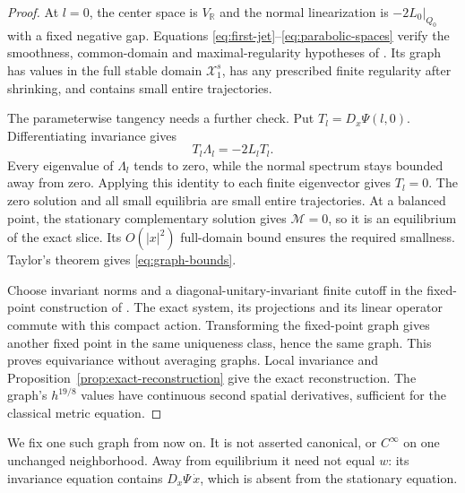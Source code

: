 \documentclass[11pt]{amsart}
\theoremstyle{definition}
\theoremstyle{remark}
\newcommand{\RR}{\mathbb R}
\begin{document}
\begin{proof}
At $l=0$, the center space is $V_{\RR}$ and the normal
linearization is $-2L_0|_{Q_0}$ with a fixed negative gap.
Equations \eqref{eq:first-jet}--\eqref{eq:parabolic-spaces} verify
the smoothness, common-domain and maximal-regularity hypotheses
of \cite[Theorem 2.1]{Simonett94}. Its graph has values in the full
stable domain $\mathcal X_1^s$, has any prescribed finite regularity
after shrinking, and contains small entire trajectories.

The parameterwise tangency needs a further check. Put
$T_l=D_x\Psi(l,0)$. Differentiating invariance gives
\[
 T_l\Lambda_l=-2L_lT_l.
\]
Every eigenvalue of $\Lambda_l$ tends to zero, while the normal
spectrum stays bounded away from zero. Applying this identity to
each finite eigenvector gives $T_l=0$. The zero solution and all
small equilibria are small entire trajectories. At a balanced
point, the stationary complementary solution gives
$\mathcal M=0$, so it is an equilibrium of the exact slice.
Its $O(|x|^2)$ full-domain bound ensures the required smallness.
Taylor's theorem gives \eqref{eq:graph-bounds}.

Choose invariant norms and a diagonal-unitary-invariant finite
cutoff in the fixed-point construction of \cite[Section 2]{Simonett94}.
The exact system, its projections and its linear operator commute
with this compact action. Transforming the fixed-point graph gives
another fixed point in the same uniqueness class, hence the same
graph. This proves equivariance without averaging graphs.
Local invariance and Proposition~\ref{prop:exact-reconstruction}
give the exact reconstruction. The graph's $h^{19/8}$ values
have continuous second spatial derivatives, sufficient for the
classical metric equation.
\end{proof}

We fix one such graph from now on. It is not asserted canonical,
or $C^\infty$ on one unchanged neighborhood. Away from equilibrium
it need not equal $w$: its invariance equation contains
$D_x\Psi\,\dot x$, which is absent from the stationary equation.
\end{document}
